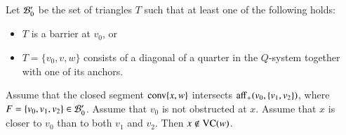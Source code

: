 \bigskip

%


Let ${\mathcal B}_0'$ be the set of triangles $T$ such that at least one
of the following holds:
\begin{itemize}
    \item $T$ is a barrier at $v_0$, or
    \item $T=\{v_0,v,w\}$ consists of a diagonal of a quarter in the
    $Q$-system together with one of its anchors.
\end{itemize}

\begin{lemma} \label{lemma:V-cell-local}
Assume that the closed segment
${\operatorname{conv}}\{x,w\}$ intersects ${\operatorname{aff}}_+(v_0,\{v_1,v_2\})$, where
$F = \{v_0,v_1,v_2\}\in {\mathcal B}'_0$. Assume that $v_0$ 
is not obstructed at $x$. Assume that $x$ is closer to $v_0$ 
than to both $v_1$ and $v_2$. Then $x\not\in{\operatorname{VC}}(w)$.
\end{lemma}


